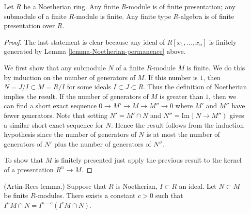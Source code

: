 \begin{lemma}
\label{lemma-Noetherian-basic}
Let $R$ be a Noetherian ring.
Any finite $R$-module is of finite presentation; any submodule
of a finite $R$-module is finite.
Any finite type $R$-algebra is of finite presentation over $R$.
\end{lemma}

\begin{proof}
The last statement is clear because any ideal of
$R[x_1,\ldots,x_n]$ is finitely generated by Lemma
\ref{lemma-Noetherian-permanence} above.

\medskip\noindent
We first show that any submodule $N$ of a finite $R$-module 
$M$ is finite. We do this by induction on the number of
generators of $M$. If this number is $1$, then $N = J/I \subset
M = R/I$ for some ideals $I \subset J \subset R$. Thus the definition
of Noetherian implies the result. If the number of generators of
$M$ is greater than $1$, then we can find a short exact sequence
$0 \to M' \to M \to M'' \to 0$ where $M'$ and $M''$ have fewer
generators. Note that setting $N' = M' \cap N$ and $N'' = \text{Im}(N\to
M'')$ gives a similar short exact sequence for $N$. Hence the result
follows from the induction hypothesis 
since the number of generators of $N$ is at most the number of
generators of $N'$ plus the number of generators of $N''$.

\medskip\noindent
To show that $M$ is finitely presented just apply the previous result
to the kernel of a presentation $R^n \to M$.
\end{proof}

\begin{lemma}
\label{lemma-Artin-Rees}
(Artin-Rees lemma.)
Suppose that $R$ is Noetherian, $I \subset R$ an ideal.
Let $N \subset M$ be finite $R$-modules.
There exists a constant $c > 0$ such that
$I^n M \cap N  =  I^{n-c}(I^cM \cap N)$.
\end{lemma}


